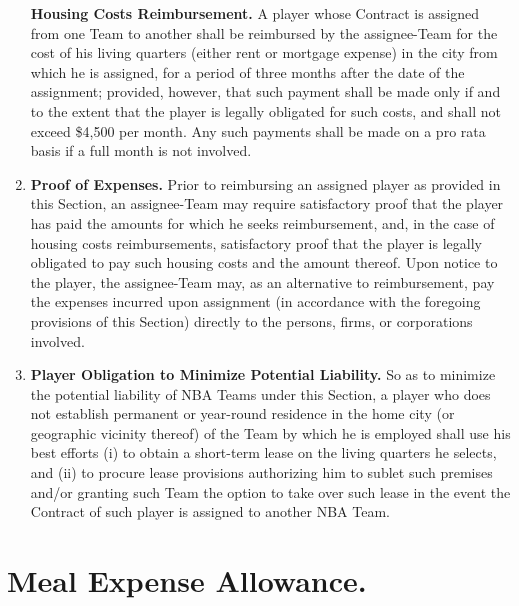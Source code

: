 \documentclass[
]{book}
\begin{document}
\begin{enumerate}
  \textbf{Housing Costs Reimbursement.} A player whose Contract is assigned from one Team to another shall be reimbursed by the assignee-Team for the cost of his living quarters (either rent or mortgage expense) in the city from which he is assigned, for a period of three months after the date of the assignment; provided, however, that such payment shall be made only if and to the extent that the player is legally obligated for such costs, and shall not exceed \$4,500 per month. Any such payments shall be made on a pro rata basis if a full month is not involved.
\item
  \textbf{Proof of Expenses.} Prior to reimbursing an assigned player as provided in this Section, an assignee-Team may require satisfactory proof that the player has paid the amounts for which he seeks reimbursement, and, in the case of housing costs reimbursements, satisfactory proof that the player is legally obligated to pay such housing costs and the amount thereof. Upon notice to the player, the assignee-Team may, as an alternative to reimbursement, pay the expenses incurred upon assignment (in accordance with the foregoing provisions of this Section) directly to the persons, firms, or corporations involved.
\item
  \textbf{Player Obligation to Minimize Potential Liability.} So as to minimize the potential liability of NBA Teams under this Section, a player who does not establish permanent or year-round residence in the home city (or geographic vicinity thereof) of the Team by which he is employed shall use his best efforts (i) to obtain a short-term lease on the living quarters he selects, and (ii) to procure lease provisions authorizing him to sublet such premises and/or granting such Team the option to take over such lease in the event the Contract of such player is assigned to another NBA Team.
\end{enumerate}

\hypertarget{meal-expense-allowance.}{%
\section{Meal Expense Allowance.}\label{meal-expense-allowance.}}
\end{document}
